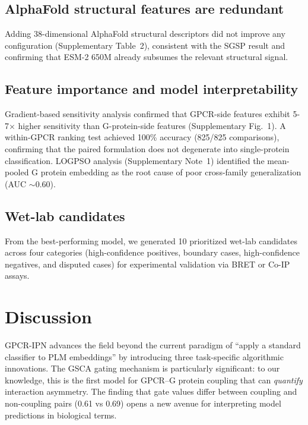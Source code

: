 \documentclass[unnumsec,webpdf,contemporary,large,numbered]{oup-authoring-template}
\begin{document}
\subsection{AlphaFold structural features are redundant}

Adding 38-dimensional AlphaFold structural descriptors did not improve any configuration (Supplementary Table~2), consistent with the SGSP result and confirming that ESM-2 650M already subsumes the relevant structural signal.

\subsection{Feature importance and model interpretability}

Gradient-based sensitivity analysis confirmed that GPCR-side features exhibit 5-7$\times$ higher sensitivity than G-protein-side features (Supplementary Fig.~1). A within-GPCR ranking test achieved 100\% accuracy (825/825 comparisons), confirming that the paired formulation does not degenerate into single-protein classification. LOGPSO analysis (Supplementary Note~1) identified the mean-pooled G protein embedding as the root cause of poor cross-family generalization (AUC $\sim$0.60).

\subsection{Wet-lab candidates}

From the best-performing model, we generated 10 prioritized wet-lab candidates across four categories (high-confidence positives, boundary cases, high-confidence negatives, and disputed cases) for experimental validation via BRET or Co-IP assays.

\section{Discussion}

GPCR-IPN advances the field beyond the current paradigm of ``apply a standard classifier to PLM embeddings'' by introducing three task-specific algorithmic innovations. The GSCA gating mechanism is particularly significant: to our knowledge, this is the first model for GPCR--G protein coupling that can \textit{quantify} interaction asymmetry. The finding that gate values differ between coupling and non-coupling pairs (0.61 vs 0.69) opens a new avenue for interpreting model predictions in biological terms.
\end{document}
